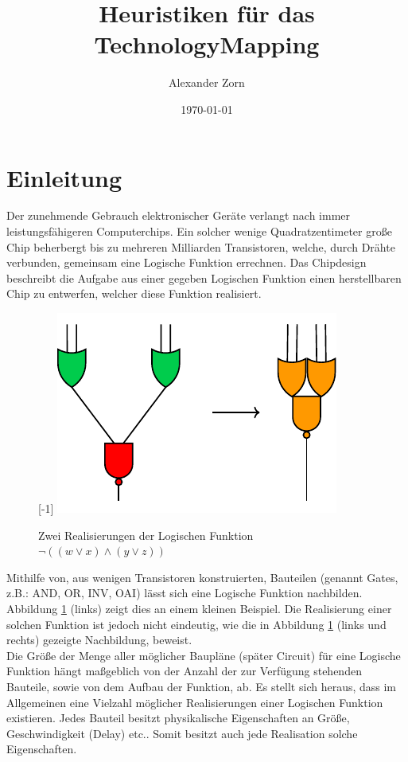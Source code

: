 \documentclass[11pt, a4paper, german]{article}
\author{Alexander Zorn}
\date{\today}
\title{Heuristiken f\"ur das TechnologyMapping}
\begin{document}
\maketitle

\tableofcontents
\newpage 
\section{Einleitung}
\label{sec:einleitung}
Der zunehmende Gebrauch elektronischer Geräte verlangt nach immer leistungsfähigeren Computerchips. Ein solcher wenige Quadratzentimeter große Chip beherbergt bis zu mehreren Milliarden Transistoren, welche, durch Drähte verbunden, gemeinsam eine Logische Funktion errechnen. Das Chipdesign beschreibt die Aufgabe aus einer gegeben Logischen Funktion einen herstellbaren Chip zu entwerfen, welcher diese Funktion realisiert. \\ 
\begin{figure}
	\scalebox{1}[-1]{
		\includegraphics[]{pictures/compiled/einfBsp}
	}
		\caption{Zwei Realisierungen der Logischen Funktion $\neg((w\lor x) \land (y \lor z))$}
		\label{bild:einfbsp}
\end{figure}
Mithilfe von, aus wenigen Transistoren konstruierten, Bauteilen (genannt Gates, z.B.: AND, OR, INV, OAI) lässt sich eine Logische Funktion nachbilden. Abbildung \ref{bild:einfbsp} (links) zeigt dies an einem kleinen Beispiel.  Die Realisierung einer solchen Funktion ist jedoch nicht eindeutig, wie die in Abbildung \ref{bild:einfbsp} (links und rechts) gezeigte Nachbildung, beweist. \\
Die Größe der Menge aller möglicher Baupläne (später Circuit) für eine Logische Funktion hängt maßgeblich von der Anzahl der zur Verfügung stehenden Bauteile, sowie von dem Aufbau der Funktion, ab.
Es stellt sich heraus, dass im Allgemeinen eine Vielzahl möglicher Realisierungen einer Logischen Funktion existieren. Jedes Bauteil besitzt physikalische Eigenschaften an Größe, Geschwindigkeit (Delay) etc.. Somit besitzt auch jede Realisation solche Eigenschaften. \\
\end{document}
